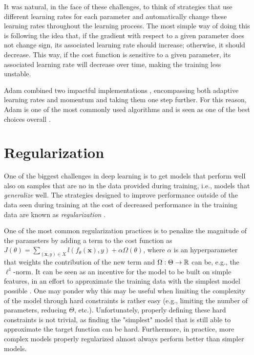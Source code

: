 It was natural, in the face of these challenges, to think of strategies that use different learning rates for each parameter and automatically change these learning rates throughout the learning process.
The most simple way of doing this is following the idea that, if the gradient with respect to a given parameter does not change sign, its associated learning rate should increase; otherwise, it should decrease.
This way, if the cost function is sensitive to a given parameter, its associated learning rate will decrease over time, making the training less unstable.

Adam\cite{kingma_adam_2015} combined two impactful implementations \cite{duchi_adaptive_2011,tieleman_lecture_2012}, encompassing both adaptive learning rates and momentum and taking them one step further.
For this reason, Adam is one of the most commonly used algorithms and is seen as one of the best choices overall \cite{ruder_overview_2017}.

\section{Regularization}

One of the biggest challenges in deep learning is to get models that perform well also on samples that are no in the data provided during training, i.e., models that \emph{generalize} well.
The strategies designed to improve performance outside of the data seen during training at the cost of decreased performance in the training data are known as \emph{regularization} \cite{goodfellow_deep_2016}.

One of the most common regularization practices is to penalize the magnitude of the parameters by adding a term to the cost function as $J\left( \theta \right) = \sum_{(\bm{x},y)\in X} l(f_\theta(\bm{x}), y) + \alpha\Omega\left( \theta \right) $, where $\alpha$ is an hyperparameter that weights the contribution of the new term and $\Omega:\Theta\to\mathbb{R}$ can be, e.g., the $\ell^1$-norm.
It can be seen as an incentive for the model to be built on simple features, in an effort to approximate the training data with the simplest model possible \cite{goodfellow_deep_2016}.
One may ponder why this may be useful when limiting the complexity of the model through hard constraints is rather easy (e.g., limiting the number of parameters, reducing $\Theta$, etc.).
Unfortunately, properly defining these hard constraints is not trivial, as finding the "simplest" model that is still able to approximate the target function can be hard.
Furthermore, in practice, more complex models properly regularized almost always perform better than simpler models\cite{goodfellow_deep_2016}.

